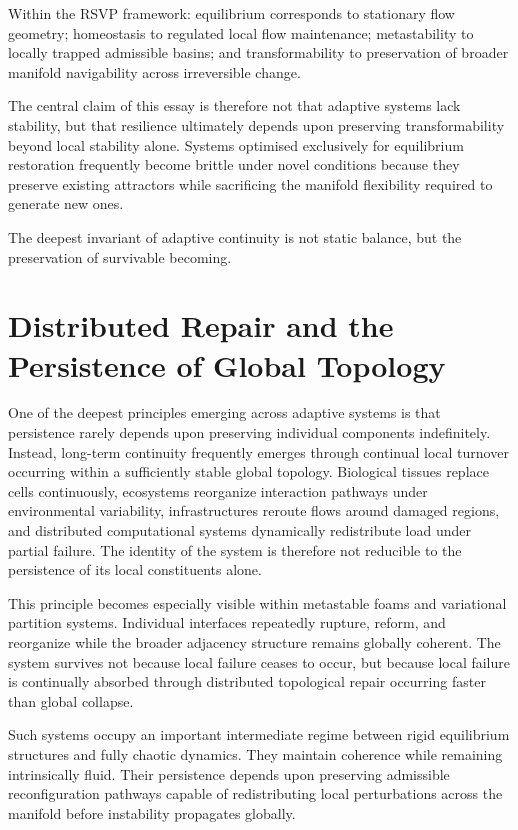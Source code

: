 \documentclass[11pt,a4paper]{article}
\begin{document}
Within the RSVP framework: equilibrium corresponds to stationary flow geometry; homeostasis to regulated local flow maintenance; metastability to locally trapped admissible basins; and transformability to preservation of broader manifold navigability across irreversible change.

The central claim of this essay is therefore not that adaptive systems lack stability, but that resilience ultimately depends upon preserving transformability beyond local stability alone. Systems optimised exclusively for equilibrium restoration frequently become brittle under novel conditions because they preserve existing attractors while sacrificing the manifold flexibility required to generate new ones.

The deepest invariant of adaptive continuity is not static balance, but the preservation of survivable becoming.


\newpage

\section{Distributed Repair and the Persistence of Global Topology}

One of the deepest principles emerging across adaptive systems is that persistence rarely depends upon preserving individual components indefinitely. Instead, long-term continuity frequently emerges through continual local turnover occurring within a sufficiently stable global topology. Biological tissues replace cells continuously, ecosystems reorganize interaction pathways under environmental variability, infrastructures reroute flows around damaged regions, and distributed computational systems dynamically redistribute load under partial failure. The identity of the system is therefore not reducible to the persistence of its local constituents alone.

This principle becomes especially visible within metastable foams and variational partition systems. Individual interfaces repeatedly rupture, reform, and reorganize while the broader adjacency structure remains globally coherent. The system survives not because local failure ceases to occur, but because local failure is continually absorbed through distributed topological repair occurring faster than global collapse.

Such systems occupy an important intermediate regime between rigid equilibrium structures and fully chaotic dynamics. They maintain coherence while remaining intrinsically fluid. Their persistence depends upon preserving admissible reconfiguration pathways capable of redistributing local perturbations across the manifold before instability propagates globally.
\end{document}
